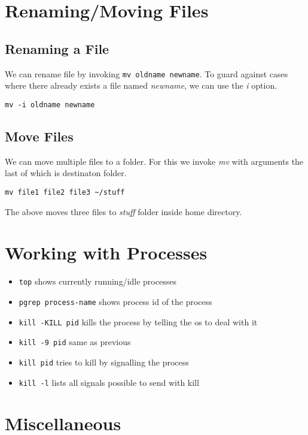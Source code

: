 \documentclass[a4paper, 12pt]{article}
\begin{document}
\section{Renaming/Moving Files}
\subsection{Renaming a File}
We can rename file by invoking \verb|mv oldname newname|.
To guard against cases where there already exists a file named \emph{newname}, we can use the \emph{i} option.
\begin{verbatim}
mv -i oldname newname
\end{verbatim}
\subsection{Move Files}
We can move multiple files to a folder. For this we invoke \emph{mv} with arguments the last of which is destinaton folder.
\begin{verbatim}
mv file1 file2 file3 ~/stuff
\end{verbatim}
The above moves three files to \emph{stuff} folder inside home directory.

\section{Working with Processes}
\begin{itemize}
	\item \verb|top| shows currently running/idle processes
	\item \verb|pgrep process-name| shows process id of the process
	\item \verb|kill -KILL pid| kills the process by telling the os to deal with it
	\item \verb|kill -9 pid| same as previous
	\item \verb|kill pid| tries to kill by signalling the process
	\item \verb|kill -l| lists all signals possible to send with kill
\end{itemize}

\section{Miscellaneous}
\end{document}
